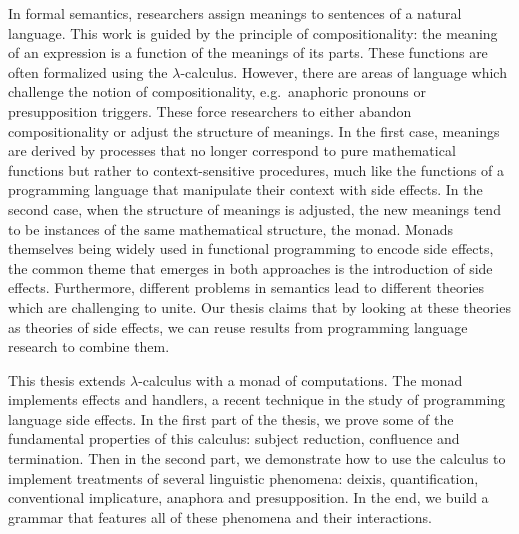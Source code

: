 \begin{ThesisAbstract}
  \begin{EnglishAbstract}
    In formal semantics, researchers assign meanings to sentences of a
    natural language. This work is guided by the principle of
    compositionality: the meaning of an expression is a function of the
    meanings of its parts. These functions are often formalized using the
    $\lambda$-calculus. However, there are areas of language which
    challenge the notion of compositionality, e.g.\ anaphoric pronouns or
    presupposition triggers. These force researchers to either abandon
    compositionality or adjust the structure of meanings.  In the first
    case, meanings are derived by processes that no longer correspond to
    pure mathematical functions but rather to context-sensitive procedures,
    much like the functions of a programming language that manipulate their
    context with side effects. In the second case, when the structure of
    meanings is adjusted, the new meanings tend to be instances of the same
    mathematical structure, the monad. Monads themselves being widely used
    in functional programming to encode side effects, the common theme that
    emerges in both approaches is the introduction of side
    effects. Furthermore, different problems in semantics lead to different
    theories which are challenging to unite. Our thesis claims that by
    looking at these theories as theories of side effects, we can reuse
    results from programming language research to combine them.

    This thesis extends $\lambda$-calculus with a monad of computations. The
    monad implements effects and handlers, a recent technique in the study
    of programming language side effects.  In the first part of the thesis,
    we prove some of the fundamental properties of this calculus: subject
    reduction, confluence and termination. Then in the second part, we
    demonstrate how to use the calculus to implement treatments of several
    linguistic phenomena: deixis, quantification, conventional implicature,
    anaphora and presupposition. In the end, we build a grammar that
    features all of these phenomena and their interactions.

  \end{EnglishAbstract}
\end{ThesisAbstract}
